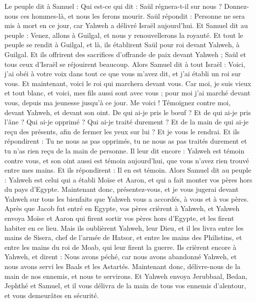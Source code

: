 \begin{multicols}{2}
Le peuple dit à Samuel : Qui est-ce qui dit : Saül régnera-t-il sur nous ? Donnez-nous ces hommes-là, et nous les ferons mourir.
Saül répondit : Personne ne sera mis à mort en ce jour, car Yahweh a délivré Israël aujourd'hui.
Et Samuel dit au peuple : Venez, allons à Guilgal, et nous y renouvellerons la royauté.
Et tout le peuple se rendit à Guilgal, et là, ils établirent Saül pour roi devant Yahweh, à Guilgal. Et ils offrirent des sacrifices d'offrande de paix devant Yahweh ; Saül et tous ceux d'Israël se réjouirent beaucoup.
\VerseOne{}Alors Samuel dit à tout Israël : Voici, j'ai obéi à votre voix dans tout ce que vous m'avez dit, et j'ai établi un roi sur vous.
Et maintenant, voici le roi qui marchera devant vous. Car moi, je suis vieux et tout blanc, et voici, mes fils aussi sont avec vous ; pour moi j'ai marché devant vous, depuis ma jeunesse jusqu'à ce jour.
Me voici ! Témoignez contre moi, devant Yahweh, et devant son oint. De qui ai-je pris le bœuf ? Et de qui ai-je pris l'âne ? Qui ai-je opprimé ? Qui ai-je traité durement ? Et de la main de qui ai-je reçu des présents, afin de fermer les yeux sur lui ? Et je vous le rendrai.
Et ils répondirent : Tu ne nous as pas opprimés, tu ne nous as pas traités durement et tu n'as rien reçu de la main de personne.
Il leur dit encore : Yahweh est témoin contre vous, et son oint aussi est témoin aujourd'hui, que vous n'avez rien trouvé entre mes mains. Et ils répondirent : Il en est témoin.
Alors Samuel dit au peuple : Yahweh est celui qui a établi Moïse et Aaron, et qui a fait monter vos pères hors du pays d'Egypte.
Maintenant donc, présentez-vous, et je vous jugerai devant Yahweh sur tous les bienfaits que Yahweh vous a accordés, à vous et à vos pères.
Après que Jacob fut entré en Egypte, vos pères crièrent à Yahweh, et Yahweh envoya Moïse et Aaron qui firent sortir vos pères hors d'Egypte, et les firent habiter en ce lieu.
Mais ils oublièrent Yahweh, leur Dieu, et il les livra entre les mains de Sisera, chef de l'armée de Hatsor, et entre les mains des Philistins, et entre les mains du roi de Moab, qui leur firent la guerre.
Ils crièrent encore à Yahweh, et dirent : Nous avons péché, car nous avons abandonné Yahweh, et nous avons servi les Baals et les Astartés. Maintenant donc, délivre-nous de la main de nos ennemis, et nous te servirons.
Et Yahweh envoya Jerubbaal, Bedan, Jephthé et Samuel, et il vous délivra de la main de tous vos ennemis d'alentour, et vous demeurâtes en sécurité.

\end{multicols}

